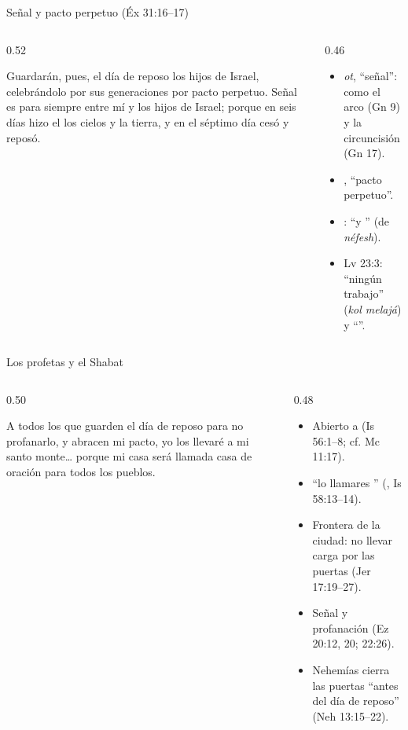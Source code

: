 \begin{frame}{Señal y pacto perpetuo (Éx 31:16--17)}
\begin{columns}[c,onlytextwidth]
\begin{column}{0.52\textwidth}
\centering\scriptsize{}
\begin{cita}Guardarán, pues, el día de reposo los hijos de Israel, celebrándolo por sus generaciones por pacto perpetuo. Señal es para siempre entre mí y los hijos de Israel; porque en seis días hizo el \SENOR{} los cielos y la tierra, y en el séptimo día cesó y reposó.\end{cita}
\end{column}
\begin{column}{0.46\textwidth}\small
\begin{itemize}
\item {} \emph{ot}, ``señal'': como el arco (Gn 9) y la circuncisión (Gn 17).
\item {}, ``pacto perpetuo''.
\item {}: ``y '' (de \emph{néfesh}).
\item Lv 23:3: ``ningún trabajo'' (\emph{kol melajá}) y ``''.
\end{itemize}
\end{column}
\end{columns}
\end{frame}

\begin{frame}{Los profetas y el Shabat}
\begin{columns}[t,onlytextwidth]
\begin{column}{0.50\textwidth}
\begin{cita}A todos los que guarden el día de reposo para no profanarlo, y abracen mi pacto, yo los llevaré a mi santo monte\ldots{} porque mi casa será llamada casa de oración para todos los pueblos.\end{cita}
\end{column}
\begin{column}{0.48\textwidth}\scriptsize
\begin{itemize}
\item Abierto a  (Is 56:1--8; cf. Mc 11:17).
\item ``lo llamares '' (, Is 58:13--14).
\item Frontera de la ciudad: no llevar carga por las puertas (Jer 17:19--27).
\item Señal y profanación (Ez 20:12, 20; 22:26).
\item Nehemías cierra las puertas ``antes del día de reposo'' (Neh 13:15--22).
\end{itemize}
\end{column}
\end{columns}
\end{frame}

